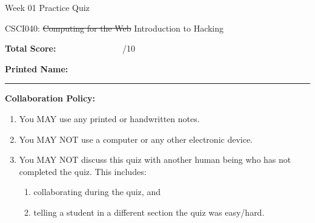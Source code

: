 \documentclass[10pt]{article}
\theoremstyle{definition}
\begin{document}
\begin{center}
    {
\Large
Week 01 Practice Quiz
}

    \vspace{0.1in}
    CSCI040: \sout{Computing for the Web} Introduction to Hacking

    \vspace{0.1in}
\end{center}

\vspace{0.15in}
\noindent
\textbf{Total Score:} ~~~~~~~~~~~~~~~/10

\vspace{0.5in}
\noindent
\textbf{Printed Name:}

\noindent
\rule{\textwidth}{0.1pt}
\vspace{0.25in}

\noindent
\textbf{Collaboration Policy:}
\begin{enumerate}
    \item You MAY use any printed or handwritten notes.
    \item You MAY NOT use a computer or any other electronic device.
    \item You MAY NOT discuss this quiz with another human being who has not completed the quiz.
        This includes:
        \begin{enumerate}
            \item collaborating during the quiz, and
            \item telling a student in a different section the quiz was easy/hard.
        \end{enumerate}
\end{enumerate}

\vspace{0.15in}
\end{document}
